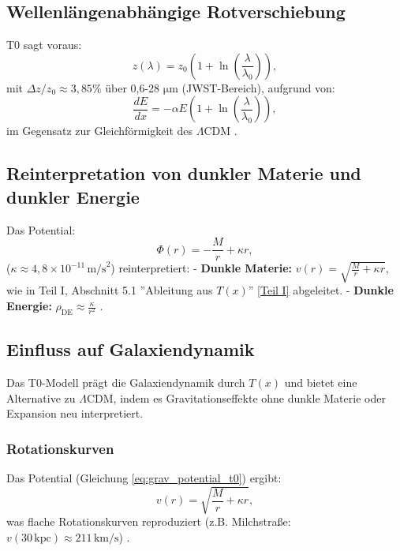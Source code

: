 \documentclass[twocolumn,aps,prl]{revtex4-2}
\newcommand{\Tfield}{T(x)}
\newcommand{\LCDM}{\Lambda\text{CDM}}
\begin{document}
	\subsection{Wellenlängenabhängige Rotverschiebung}
	\label{subsec:wavelength_redshift}
	
	T0 sagt voraus:
	\begin{equation}
		z(\lambda) = z_0 \left(1 + \ln\left(\frac{\lambda}{\lambda_0}\right)\right),
		\label{eq:wavelength_redshift}
	\end{equation}
	mit \(\Delta z / z_0 \approx 3,85\%\) über 0,6-28 \(\si{\micro\meter}\) (JWST-Bereich), aufgrund von:
	\begin{equation}
		\frac{dE}{dx} = -\alpha E \left(1 + \ln\left(\frac{\lambda}{\lambda_0}\right)\right),
		\label{eq:wavelength_energy_loss}
	\end{equation}
	im Gegensatz zur Gleichförmigkeit des \(\LCDM\) \cite{pascher_params_2025}.
	
	\subsection{Reinterpretation von dunkler Materie und dunkler Energie}
	\label{subsec:dark_reinterpretation}
	
	Das Potential:
	\begin{equation}
		\Phi(r) = -\frac{M}{r} + \kappa r,
		\label{eq:grav_potential_t0}
	\end{equation}
	(\(\kappa \approx 4,8 \times 10^{-11} \, \text{m/s}^2\)) reinterpretiert:
	- \textbf{Dunkle Materie:} \(v(r) = \sqrt{\frac{M}{r} + \kappa r}\), wie in Teil I, Abschnitt 5.1 ''Ableitung aus \(\Tfield\)'' \href{https://github.com/jpascher/T0-Time-Mass-Duality/tree/main/2/pdf/Deutsch/QMRelTimeMassPart1.pdf}{[Teil I]} abgeleitet.
	- \textbf{Dunkle Energie:} \(\rho_{\text{DE}} \approx \frac{\kappa}{r^2}\) \cite{pascher_galaxies_2025}.
	
	\subsection{Einfluss auf Galaxiendynamik}
	\label{subsec:galaxy_dynamics}
	
	Das T0-Modell prägt die Galaxiendynamik durch \(\Tfield\) und bietet eine Alternative zu \(\LCDM\), indem es Gravitationseffekte ohne dunkle Materie oder Expansion neu interpretiert.
	
	\subsubsection{Rotationskurven}
	Das Potential (Gleichung \ref{eq:grav_potential_t0}) ergibt:
	\begin{equation}
		v(r) = \sqrt{\frac{M}{r} + \kappa r},
		\label{eq:rotation_velocity}
	\end{equation}
	was flache Rotationskurven reproduziert (z.B. Milchstraße: \(v(30 \, \text{kpc}) \approx 211 \, \text{km/s}\)) \cite{pascher_galaxies_2025}.
	
\end{document}

